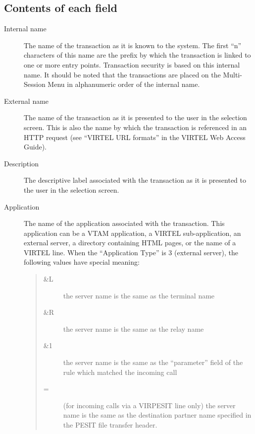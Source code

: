\documentclass[letterpaper,10pt,english]{sphinxmanual}
\begin{document}


\subsection{Contents of each field}
\label{\detokenize{connectivity_guide:id17}}\begin{description}
\item[{Internal name}] \leavevmode
The name of the transaction as it is known to the system. The first “n” characters of this name are the prefix by which the transaction is linked to one or more entry points. Transaction security is based on this internal name. It should be noted that the transactions are placed on the Multi-Session Menu in alphanumeric order of the internal name.

\item[{External name}] \leavevmode
The name of the transaction as it is presented to the user in the selection screen. This is also the name by which the transaction is referenced in an HTTP request (see “VIRTEL URL formats” in the VIRTEL Web Access Guide).

\item[{Description}] \leavevmode
The descriptive label associated with the transaction as it is presented to the user in the selection screen.

\item[{Application}] \leavevmode
The name of the application associated with the transaction. This application can be a VTAM application, a VIRTEL sub-application, an external server, a directory containing HTML pages, or the name of a VIRTEL line. When the “Application Type” is 3 (external server), the following values have special meaning:
\begin{quote}
\begin{description}
\item[{\&L}] \leavevmode
the server name is the same as the terminal name

\item[{\&R}] \leavevmode
the server name is the same as the relay name

\item[{\&1}] \leavevmode
the server name is the same as the “parameter” field of the rule which matched the incoming call

\item[{=}] \leavevmode
(for incoming calls via a VIRPESIT line only) the server name is the same as the destination partner name specified in the PESIT file transfer header.


\end{description}
\end{quote}
\end{description}
\end{document}
